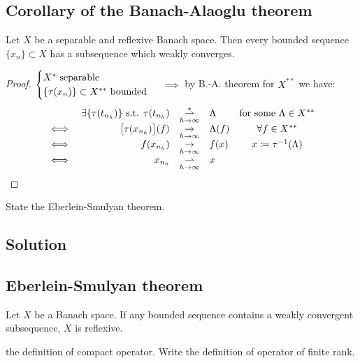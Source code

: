 \subsection{Corollary of the Banach-Alaoglu theorem}
Let $X$ be a separable and reflexive Banach space. Then every bounded sequence $\{x_n\} \subset X$ has a subsequence which weakly converges.
\begin{proof}
    $
    \\\\
    \begin{aligned}
        \begin{cases}
            X^* \text{ separable} \\
            \{\tau(x_n)\} \subset X^{**} \text{ bounded} 
        \end{cases}
    \end{aligned}$ $\implies $ by B.-A. theorem for $X^{**}$  we have: \[
    \begin{array}{lrclc}
        & \exists \{\tau(t_{n_h})\} \mbox{ s.t. } \tau(t_{n_h}) & \underset{h\to\infty}{\overset{\ast}{\rightharpoonup}} & \Lambda & \mbox{for some } \Lambda \in X^{**} \\
        \iff & \big[\tau(x_{n_h})\big](f) & \underset{h\to\infty}{\to} & \Lambda(f) & \forall f \in X^{**} \\
        \iff & f(x_{n_h}) & \underset{h\to\infty}{\to} & f(x) & x\coloneqq\tau^{-1}(\Lambda) \\
        \iff & x_{n_h} & \underset{h\to\infty}{\rightharpoonup} & x
    \end{array}
    \]    
\end{proof}


\question
State the Eberlein-Smulyan theorem.

\subsection*{Solution}

\subsection{Eberlein-Smulyan theorem}
Let $X$ be a Banach space. If any bounded sequence contains a weakly convergent subsequence, $X$ is reflexive.


\question
the definition of compact operator. Write the definition of operator of finite rank.

